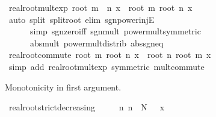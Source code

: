 \begin{isabellebody}
\ real{\isacharunderscore}{\kern0pt}root{\isacharunderscore}{\kern0pt}mult{\isacharunderscore}{\kern0pt}exp{\isacharcolon}{\kern0pt}\ {\isachardoublequoteopen}root\ {\isacharparenleft}{\kern0pt}m\ {\isacharasterisk}{\kern0pt}\ n{\isacharparenright}{\kern0pt}\ x\ {\isacharequal}{\kern0pt}\ root\ m\ {\isacharparenleft}{\kern0pt}root\ n\ x{\isacharparenright}{\kern0pt}{\isachardoublequoteclose}\isanewline
%
\isadelimproof
\ \ %
\endisadelimproof
%
\isatagproof
{}\isamarkupfalse%
\ {\isacharparenleft}{\kern0pt}auto\ split{\isacharcolon}{\kern0pt}\ split{\isacharunderscore}{\kern0pt}root\ elim{\isacharbang}{\kern0pt}{\isacharcolon}{\kern0pt}\ sgn{\isacharunderscore}{\kern0pt}power{\isacharunderscore}{\kern0pt}injE\isanewline
\ \ \ \ \ \ simp{\isacharcolon}{\kern0pt}\ sgn{\isacharunderscore}{\kern0pt}zero{\isacharunderscore}{\kern0pt}iff\ sgn{\isacharunderscore}{\kern0pt}mult\ power{\isacharunderscore}{\kern0pt}mult{\isacharbrackleft}{\kern0pt}symmetric{\isacharbrackright}{\kern0pt}\isanewline
\ \ \ \ \ \ abs{\isacharunderscore}{\kern0pt}mult\ power{\isacharunderscore}{\kern0pt}mult{\isacharunderscore}{\kern0pt}distrib\ abs{\isacharunderscore}{\kern0pt}sgn{\isacharunderscore}{\kern0pt}eq{\isacharparenright}{\kern0pt}%
\endisatagproof
{\isafoldproof}%
%
\isadelimproof
\isanewline
%
\endisadelimproof
\isanewline
{}\isamarkupfalse%
\ real{\isacharunderscore}{\kern0pt}root{\isacharunderscore}{\kern0pt}commute{\isacharcolon}{\kern0pt}\ {\isachardoublequoteopen}root\ m\ {\isacharparenleft}{\kern0pt}root\ n\ x{\isacharparenright}{\kern0pt}\ {\isacharequal}{\kern0pt}\ root\ n\ {\isacharparenleft}{\kern0pt}root\ m\ x{\isacharparenright}{\kern0pt}{\isachardoublequoteclose}\isanewline
%
\isadelimproof
\ \ %
\endisadelimproof
%
\isatagproof
{}\isamarkupfalse%
\ {\isacharparenleft}{\kern0pt}simp\ add{\isacharcolon}{\kern0pt}\ real{\isacharunderscore}{\kern0pt}root{\isacharunderscore}{\kern0pt}mult{\isacharunderscore}{\kern0pt}exp\ {\isacharbrackleft}{\kern0pt}symmetric{\isacharbrackright}{\kern0pt}\ mult{\isachardot}{\kern0pt}commute{\isacharparenright}{\kern0pt}%
\endisatagproof
{\isafoldproof}%
%
\isadelimproof
%
\endisadelimproof
%
\begin{isamarkuptext}%
Monotonicity in first argument.%
\end{isamarkuptext}\isamarkuptrue%
\isamarkupfalse%
\ real{\isacharunderscore}{\kern0pt}root{\isacharunderscore}{\kern0pt}strict{\isacharunderscore}{\kern0pt}decreasing{\isacharcolon}{\kern0pt}\isanewline
\ \ \ {\isachardoublequoteopen}{}\ {\isacharless}{\kern0pt}\ n{\isachardoublequoteclose}\ {\isachardoublequoteopen}n\ {\isacharless}{\kern0pt}\ N{\isachardoublequoteclose}\ {\isachardoublequoteopen}{}\ {\isacharless}{\kern0pt}\ x{\isachardoublequoteclose}\isanewline

\end{isabellebody}
